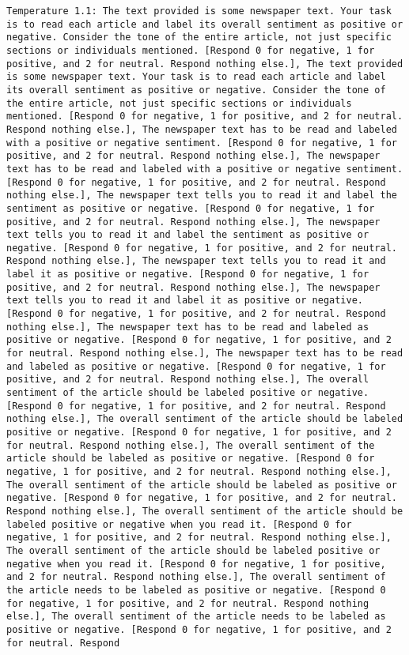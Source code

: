 \begin{lstlisting}[label=lst:poor_performing_prompts]
	Temperature 1.1: The text provided is some newspaper text. Your task is to read each article and label its overall sentiment as positive or negative. Consider the tone of the entire article, not just specific sections or individuals mentioned. [Respond 0 for negative, 1 for positive, and 2 for neutral. Respond nothing else.], The text provided is some newspaper text. Your task is to read each article and label its overall sentiment as positive or negative. Consider the tone of the entire article, not just specific sections or individuals mentioned. [Respond 0 for negative, 1 for positive, and 2 for neutral. Respond nothing else.], The newspaper text has to be read and labeled with a positive or negative sentiment. [Respond 0 for negative, 1 for positive, and 2 for neutral. Respond nothing else.], The newspaper text has to be read and labeled with a positive or negative sentiment. [Respond 0 for negative, 1 for positive, and 2 for neutral. Respond nothing else.], The newspaper text tells you to read it and label the sentiment as positive or negative. [Respond 0 for negative, 1 for positive, and 2 for neutral. Respond nothing else.], The newspaper text tells you to read it and label the sentiment as positive or negative. [Respond 0 for negative, 1 for positive, and 2 for neutral. Respond nothing else.], The newspaper text tells you to read it and label it as positive or negative. [Respond 0 for negative, 1 for positive, and 2 for neutral. Respond nothing else.], The newspaper text tells you to read it and label it as positive or negative. [Respond 0 for negative, 1 for positive, and 2 for neutral. Respond nothing else.], The newspaper text has to be read and labeled as positive or negative. [Respond 0 for negative, 1 for positive, and 2 for neutral. Respond nothing else.], The newspaper text has to be read and labeled as positive or negative. [Respond 0 for negative, 1 for positive, and 2 for neutral. Respond nothing else.], The overall sentiment of the article should be labeled positive or negative. [Respond 0 for negative, 1 for positive, and 2 for neutral. Respond nothing else.], The overall sentiment of the article should be labeled positive or negative. [Respond 0 for negative, 1 for positive, and 2 for neutral. Respond nothing else.], The overall sentiment of the article should be labeled as positive or negative. [Respond 0 for negative, 1 for positive, and 2 for neutral. Respond nothing else.], The overall sentiment of the article should be labeled as positive or negative. [Respond 0 for negative, 1 for positive, and 2 for neutral. Respond nothing else.], The overall sentiment of the article should be labeled positive or negative when you read it. [Respond 0 for negative, 1 for positive, and 2 for neutral. Respond nothing else.], The overall sentiment of the article should be labeled positive or negative when you read it. [Respond 0 for negative, 1 for positive, and 2 for neutral. Respond nothing else.], The overall sentiment of the article needs to be labeled as positive or negative. [Respond 0 for negative, 1 for positive, and 2 for neutral. Respond nothing else.], The overall sentiment of the article needs to be labeled as positive or negative. [Respond 0 for negative, 1 for positive, and 2 for neutral. Respond 
\end{lstlisting}
